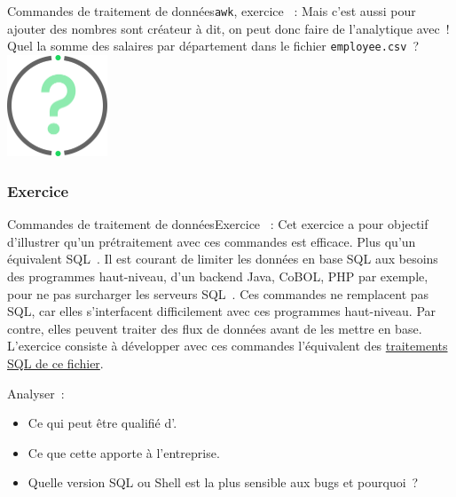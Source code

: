 \documentclass{beamer}
\begin{document}
    \begin{frame}{Commandes de traitement de données}{\lstinline{awk}, exercice \execcounterdispinc{}~:}
        Mais c'est aussi pour ajouter des nombres sont créateur à dit, on peut donc faire de l'analytique avec~!
        \bigbreak
        Quel la somme des salaires par département dans le fichier \lstinline{employee.csv}~?
        \bigbreak
        \centering
        \includegraphics[width=3cm]{image/question-mark}
    \end{frame}

    \subsubsection{Exercice}\label{subsubsec:data-exercice}
    \begin{frame}{Commandes de traitement de données}{Exercice \execcounterdispinc{}~:}
        Cet exercice a pour objectif d'illustrer qu'un prétraitement avec ces commandes est efficace.
        Plus qu'un équivalent SQL~.
        \bigbreak
        Il est courant de limiter les données en base SQL aux besoins des programmes haut-niveau, d'un backend Java, CoBOL, PHP par exemple, pour ne pas surcharger les serveurs SQL~.
        \bigbreak
        Ces commandes ne remplacent pas SQL, car elles s'interfacent difficilement avec ces programmes haut-niveau.
        \bigbreak
        Par contre, elles peuvent traiter des flux de données avant de les mettre en base.
        L'exercice consiste à développer avec ces commandes l'équivalent des \href{https://github.com/DigicompClassesByPapIT/linux2/blob/main/sqlite-hr.sh}{traitements SQL de ce fichier}.

        Analyser~:
        \begin{itemize}
            \item Ce qui peut être qualifié d'.
            \item Ce que cette  apporte à l'entreprise.
            \item Quelle version SQL ou Shell est la plus sensible aux bugs et pourquoi~?
        \end{itemize}
    \end{frame}
\end{document}
